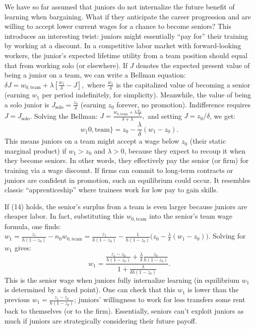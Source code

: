 \documentclass[12pt]{article}
\begin{document}
We have so far assumed that juniors {do not internalize} the future
benefit of learning when bargaining. What if they {anticipate the
career progression} and are willing to accept lower current wages for a
chance to become seniors? This introduces an interesting twist: juniors
might essentially ``pay for'' their training by working at a discount.
In a competitive labor market with forward-looking workers, the junior's
expected lifetime utility from a team position should equal that from
working solo (or elsewhere). If \(J\) denotes the expected {present
value} of being a junior on a team, we can write a {Bellman
equation}:
\(\delta J = w_{0,\text{team}} + \lambda [\frac{w_1}{\delta} - J],\)
where \(\frac{w_1}{\delta}\) is the capitalized value of becoming a
senior (earning \(w_1\) per period indefinitely, for simplicity).
Meanwhile, the value of being a solo junior is
\(J_{\text{solo}} = \frac{z_0}{\delta}\) (earning \(z_0\) forever, no
promotion). Indifference requires \(J = J_{\text{solo}}\). Solving the
Bellman:
\(J = \frac{w_{0,\text{team}} + \lambda \frac{w_1}{\delta}}{\delta + \lambda},\)
and setting \(J = z_0/\delta\), we get:
\begin{equation}
w_\{0,\text{team}\} = z_0 -
\frac{\lambda}{\delta}(w_1 - z_0). \tag{14}
\end{equation}
This means juniors on a
team might accept a wage {below} \(z_0\) (their static marginal
product) if \(w_1 > z_0\) and \(\lambda>0\), because they expect to
recoup it when they become seniors. In other words, they effectively pay
the senior (or firm) for training via a wage discount. If firms can
commit to long-term contracts or juniors are confident in promotion,
such an equilibrium could occur. It resembles classic ``apprenticeship''
where trainees work for low pay to gain skills.

If (14) holds, the senior's surplus from a team is even larger because
juniors are cheaper labor. In fact, substituting this
\(w_{0,\text{team}}\) into the senior's team wage formula, one finds:
\(w_1 = \frac{z_1}{h(1-z_0)} - n_0 w_{0,\text{team}} = \frac{z_1}{h(1-z_0)} - \frac{1}{h(1-z_0)}\Big(z_0 - \frac{\lambda}{\delta}(w_1 - z_0)\Big).\)
Solving for \(w_1\) gives: 
\begin{equation}
w_1 =
\frac{\frac{z_1 - z_0}{h(1-z_0)} + \frac{\lambda}{\delta}\frac{z_0}{h(1-z_0)}}{1 + \frac{\lambda}{\delta h(1-z_0)}}.
\tag{15}
\end{equation}
This is the senior wage when juniors fully internalize
learning (in equilibrium \(w_1\) is determined by a fixed point). One
can check that this \(w_1\) is lower than the previous
\(w_1 = \frac{z_1 - z_0}{h(1-z_0)}\); juniors' willingness to work for
less transfers some rent back to themselves (or to the firm).
Essentially, seniors can't exploit juniors as much if juniors are
strategically considering their future payoff.
\end{document}
